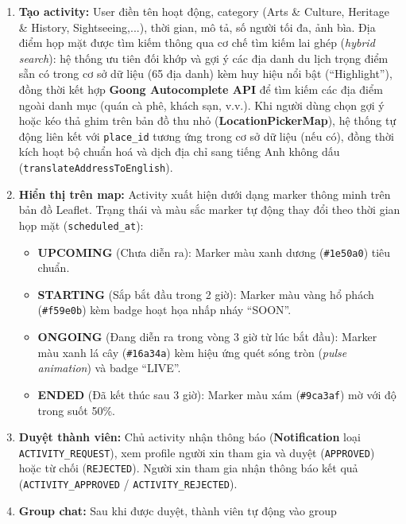 \documentclass[12pt,a4paper]{article}
\begin{document}
\begin{enumerate}
  \item \textbf{Tạo activity:} User điền tên hoạt động, category (Arts \&
        Culture, Heritage \& History, Sightseeing,...), thời gian, mô tả, số
        người tối đa, ảnh bìa. Địa điểm họp mặt được tìm kiếm thông qua cơ
        chế tìm kiếm lai ghép (\textit{hybrid search}): hệ thống ưu tiên đối
        khớp và gợi ý các địa danh du lịch trọng điểm sẵn có trong cơ sở dữ
        liệu (65 địa danh) kèm huy hiệu nổi bật (``Highlight''), đồng thời
        kết hợp \textbf{Goong Autocomplete API} để tìm kiếm các địa điểm
        ngoài danh mục (quán cà phê, khách sạn, v.v.). Khi người dùng chọn
        gợi ý hoặc kéo thả ghim trên bản đồ thu nhỏ (\textbf{LocationPickerMap}),
        hệ thống tự động liên kết với \texttt{place\_id} tương ứng trong cơ
        sở dữ liệu (nếu có), đồng thời kích hoạt bộ chuẩn hoá và dịch địa
        chỉ sang tiếng Anh không dấu (\texttt{translateAddressToEnglish}).
  \item \textbf{Hiển thị trên map:} Activity xuất hiện dưới dạng marker thông
        minh trên bản đồ Leaflet. Trạng thái và màu sắc marker tự động thay
        đổi theo thời gian họp mặt (\texttt{scheduled\_at}):
        \begin{itemize}
          \item \textbf{UPCOMING} (Chưa diễn ra): Marker màu xanh dương
                (\texttt{\#1e50a0}) tiêu chuẩn.
          \item \textbf{STARTING} (Sắp bắt đầu trong 2 giờ): Marker màu vàng
                hổ phách (\texttt{\#f59e0b}) kèm badge hoạt họa nhấp nháy
                ``SOON''.
          \item \textbf{ONGOING} (Đang diễn ra trong vòng 3 giờ từ lúc bắt
                đầu): Marker màu xanh lá cây (\texttt{\#16a34a}) kèm hiệu ứng
                quét sóng tròn (\textit{pulse animation}) và badge ``LIVE''.
          \item \textbf{ENDED} (Đã kết thúc sau 3 giờ): Marker màu xám
                (\texttt{\#9ca3af}) mờ với độ trong suốt 50\%.
        \end{itemize}
  \item \textbf{Duyệt thành viên:} Chủ activity nhận thông báo
        (\textbf{Notification} loại \texttt{ACTIVITY\_REQUEST}), xem profile
        người xin tham gia và duyệt (\texttt{APPROVED}) hoặc từ chối
        (\texttt{REJECTED}). Người xin tham gia nhận thông báo kết quả
        (\texttt{ACTIVITY\_APPROVED} / \texttt{ACTIVITY\_REJECTED}).
  \item \textbf{Group chat:} Sau khi được duyệt, thành viên tự động vào group

\end{enumerate}
\end{document}
